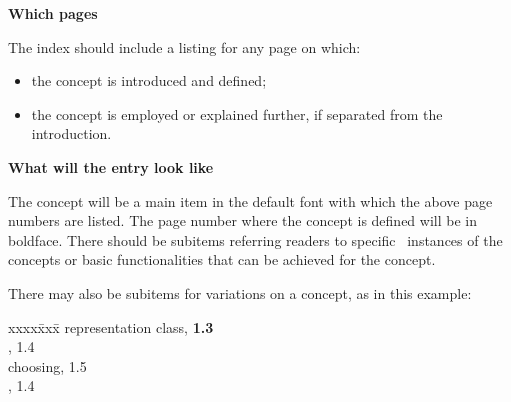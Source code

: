 \documentclass[11pt]{article}
\newenvironment{indexex}{\begin{tabbing}
xxxx\=xxx\=\kill}{\end{tabbing}}
\begin{document}
\begin{description}
   \item{\bf Which pages}

         The index should include a listing for any page on which:
           \begin{itemize}
               \item the concept is introduced and defined;
               \item the concept is employed or explained
                     further, if separated from the introduction.
           \end{itemize}
   \item{\bf What will the entry look like}

        The concept will be a main item in the default font with which the 
        above page numbers
        are listed.  The page number where the concept is defined will be in
        boldface. There should be subitems referring readers to specific
        \cgal\ instances of the concepts or basic functionalities that
        can be achieved for the concept.  

        There may also be subitems for variations on a concept,  as in 
        this example:
        \begin{indexex}
        representation class,                                {\bf 1.3} \\
        \> ,                           1.4 \\
        \> choosing,                                               1.5 \\
        \> ,                         1.4 \\
        \end{indexex}


\end{description}
\end{document}
